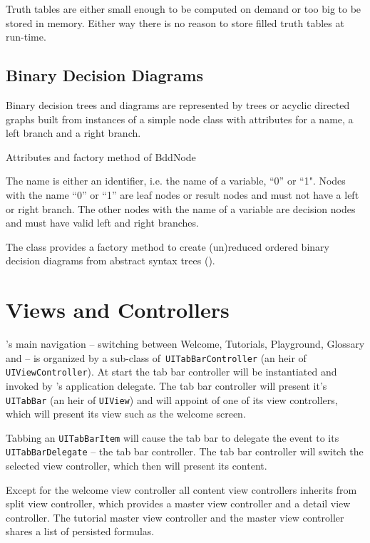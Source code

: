 Truth tables are either small enough to be computed on demand or too big to be stored in memory.
Either way there is no reason to store filled truth tables at run-time.

\subsection{Binary Decision Diagrams}

Binary decision trees and diagrams are represented by trees 
or acyclic directed graphs built from instances of a simple node class
 with attributes for a name, a left branch and a right branch. 
\begin{table}[htdp]
\begin{center}
\caption{Attributes and factory method of BddNode}
\label{fig:BddNode}
\end{center}
\end{table}
The name is either an identifier, i.e. the name of a variable, “0” or “1". 
Nodes with the name “0” or “1” are leaf nodes or result nodes
and must not have a left or right branch.
The other nodes with the name of a variable are decision nodes 
and must have valid left and right branches. 

The class provides a factory method to create 
(un)reduced ordered binary decision diagrams from abstract syntax trees
().

\newpage
\section{Views and Controllers}

\Nyaya's main navigation – switching between Welcome, Tutorials, Playground, Glossary and \BoolTool – 
is organized by a sub-class of\verb+ UITabBarController+ (an heir of \verb+UIViewController+). 
At start the tab bar controller will be instantiated and invoked by \Nyaya's application delegate. 
The tab bar controller will present it's \verb+UITabBar+ (an heir of \verb+UIView+)
and will appoint of one of its view controllers, which will present its view such as the welcome screen.

Tabbing an \verb+UITabBarItem+ will cause the tab bar to delegate the event to its \verb+UITabBarDelegate+ – the tab bar controller.
The tab bar controller will switch the selected view controller, which then will present its content.

Except for the welcome view controller 
all content view controllers inherits from split view controller,
which provides a master view controller and a detail view controller.
The tutorial master view controller and the \BoolTool master view controller shares a list of persisted formulas.


